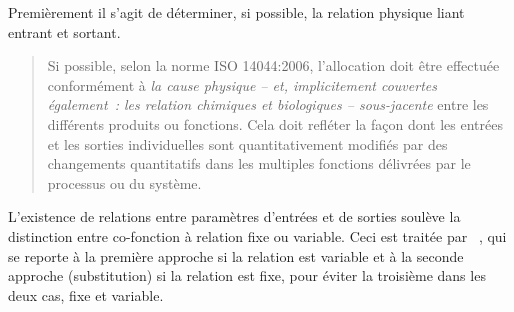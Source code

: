 Premièrement il s'agit de déterminer, si possible, la relation physique liant entrant et sortant.
\blockcquote[p.~79]{european_commission_ilcd_2010}{
Si possible, selon la norme ISO 14044:2006, l'allocation doit être effectuée conformément à \emph{la cause physique  -- et, implicitement couvertes également~: les relation chimiques et biologiques -- sous-jacente} entre les différents produits ou fonctions.
Cela doit refléter la façon dont les entrées et les sorties individuelles sont quantitativement modifiés par des changements quantitatifs dans les multiples fonctions délivrées par le processus ou du système.
}

L’existence de relations entre paramètres d'entrées et de sorties soulève la distinction entre co-fonction à relation fixe ou variable.
Ceci est traitée par \citeauthor{weidema_avoiding_2000}~\cite{weidema_avoiding_2010,weidema_has_2014}, qui se reporte à la première approche si la relation est variable et à la seconde approche (substitution) si la relation est fixe, pour éviter la troisième dans les deux cas, fixe et variable.


